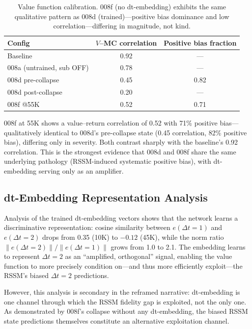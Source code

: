 \documentclass[10pt,letterpaper]{article}
\newcommand{\dt}{\Delta t}
\begin{document}
\begin{table}[t]
\centering
\caption{Value function calibration. 008f (no dt-embedding) exhibits the same qualitative pattern as 008d (trained)---positive bias dominance and low correlation---differing in magnitude, not kind.}
\label{tab:value_corr}
\small
\begin{tabular}{lcc}
\toprule
Config & $V$--MC correlation & Positive bias fraction \\
\midrule
Baseline & 0.92 & --- \\
008a (untrained, sub OFF) & 0.78 & --- \\
008d pre-collapse & 0.45 & 0.82 \\
008d post-collapse & 0.20 & --- \\
008f @55K & 0.52 & 0.71 \\
\bottomrule
\end{tabular}
\end{table}

008f at 55K shows a value--return correlation of 0.52 with 71\% positive bias---qualitatively identical to 008d's pre-collapse state (0.45 correlation, 82\% positive bias), differing only in severity.
Both contrast sharply with the baseline's 0.92 correlation.
This is the strongest evidence that 008d and 008f share the same underlying pathology (RSSM-induced systematic positive bias), with dt-embedding serving only as an amplifier.

\subsection{dt-Embedding Representation Analysis}\label{sec:dt_emb_analysis}

Analysis of the trained dt-embedding vectors shows that the network learns a discriminative representation: cosine similarity between $e(\dt=1)$ and $e(\dt=2)$ drops from 0.35 (10K) to $-0.12$ (45K), while the norm ratio $\|e(\dt=2)\| / \|e(\dt=1)\|$ grows from 1.0 to 2.1.
The embedding learns to represent $\dt=2$ as an ``amplified, orthogonal'' signal, enabling the value function to more precisely condition on---and thus more efficiently exploit---the RSSM's biased $\dt=2$ predictions.

However, this analysis is secondary in the reframed narrative: dt-embedding is one channel through which the RSSM fidelity gap is exploited, not the only one.
As demonstrated by 008f's collapse without any dt-embedding, the biased RSSM state predictions themselves constitute an alternative exploitation channel.
\end{document}
